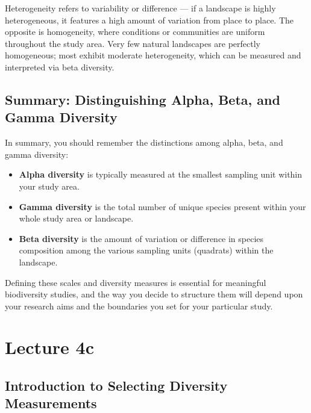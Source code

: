 \documentclass[
  12pt,
]{book}
\providecommand{\tightlist}{%
  \setlength{\itemsep}{0pt}\setlength{\parskip}{0pt}}
\begin{document}
Heterogeneity refers to variability or difference --- if a landscape is
highly heterogeneous, it features a high amount of variation from place
to place. The opposite is homogeneity, where conditions or communities
are uniform throughout the study area. Very few natural landscapes are
perfectly homogeneous; most exhibit moderate heterogeneity, which can be
measured and interpreted via beta diversity.

\section{Summary: Distinguishing Alpha, Beta, and Gamma
Diversity}\label{summary-distinguishing-alpha-beta-and-gamma-diversity}

In summary, you should remember the distinctions among alpha, beta, and
gamma diversity:

\begin{itemize}
\tightlist
\item
  \textbf{Alpha diversity} is typically measured at the smallest
  sampling unit within your study area.
\item
  \textbf{Gamma diversity} is the total number of unique species present
  within your whole study area or landscape.
\item
  \textbf{Beta diversity} is the amount of variation or difference in
  species composition among the various sampling units (quadrats) within
  the landscape.
\end{itemize}

Defining these scales and diversity measures is essential for meaningful
biodiversity studies, and the way you decide to structure them will
depend upon your research aims and the boundaries you set for your
particular study.

\chapter*{Lecture 4c}\label{lecture-4c}

\section{Introduction to Selecting Diversity
Measurements}\label{introduction-to-selecting-diversity-measurements}
\end{document}
